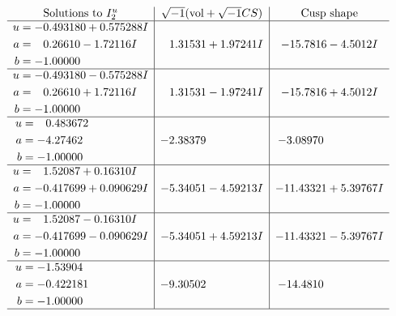 \documentclass[1p]{elsarticle_modified}
\theoremstyle{definition}
\newcommand{\I}{\sqrt{-1}}
\begin{document}
$$\begin{array}{c|c|c}  
\text{Solutions to }I^u_{2}& \I (\text{vol} + \sqrt{-1}CS) & \text{Cusp shape}\\
 \hline 
\begin{aligned}
u &= -0.493180 + 0.575288 I \\
a &= \phantom{-}0.26610 - 1.72116 I \\
b &= -1.00000\phantom{ +0.000000I}\end{aligned}
 & \phantom{-}1.31531 + 1.97241 I & -15.7816 - 4.5012 I \\ \hline\begin{aligned}
u &= -0.493180 - 0.575288 I \\
a &= \phantom{-}0.26610 + 1.72116 I \\
b &= -1.00000\phantom{ +0.000000I}\end{aligned}
 & \phantom{-}1.31531 - 1.97241 I & -15.7816 + 4.5012 I \\ \hline\begin{aligned}
u &= \phantom{-}0.483672\phantom{ +0.000000I} \\
a &= -4.27462\phantom{ +0.000000I} \\
b &= -1.00000\phantom{ +0.000000I}\end{aligned}
 & -2.38379\phantom{ +0.000000I} & -3.08970\phantom{ +0.000000I} \\ \hline\begin{aligned}
u &= \phantom{-}1.52087 + 0.16310 I \\
a &= -0.417699 + 0.090629 I \\
b &= -1.00000\phantom{ +0.000000I}\end{aligned}
 & -5.34051 - 4.59213 I & -11.43321 + 5.39767 I \\ \hline\begin{aligned}
u &= \phantom{-}1.52087 - 0.16310 I \\
a &= -0.417699 - 0.090629 I \\
b &= -1.00000\phantom{ +0.000000I}\end{aligned}
 & -5.34051 + 4.59213 I & -11.43321 - 5.39767 I \\ \hline\begin{aligned}
u &= -1.53904\phantom{ +0.000000I} \\
a &= -0.422181\phantom{ +0.000000I} \\
b &= -1.00000\phantom{ +0.000000I}\end{aligned}
 & -9.30502\phantom{ +0.000000I} & -14.4810\phantom{ +0.000000I}\\
 \hline 
 \end{array}$$\newpage\newpage\renewcommand{\arraystretch}{1}
\end{document}
